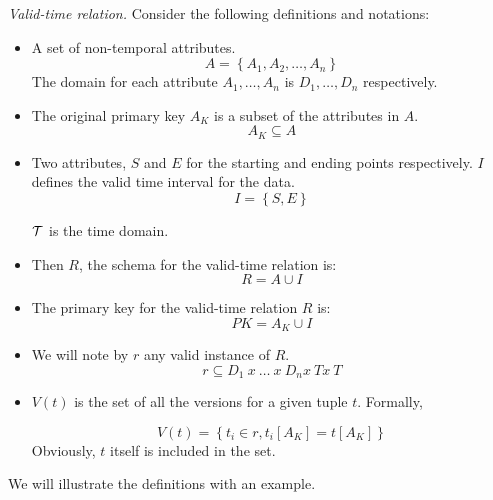 \begin{definition}
\label{def:valid-time-relation}
\emph{Valid-time relation.}
Consider the following definitions and notations:

\begin{itemize}
 \item A set of non-temporal attributes.
	\begin{equation}
	\label{eq:attribute-set}
	A = \left \lbrace A_1, A_2, \ldots, A_n \right \rbrace
	\end{equation}
      The domain for each attribute $A_1, \ldots, A_n$ is $D_1, \ldots, D_n$ respectively. 
\item The original primary key $A_K$ is a subset of the attributes in $A$.
      \begin{equation}
       \label{eq:primary-key-a}
      A_K \subseteq A
      \end{equation}
\item Two attributes, $S$  and $E$ for the starting and ending points respectively. $I$ defines the valid time interval for the data. 
\begin{equation}
 \label{eq:attribute-time-interval}
I = \left \lbrace S, E \right \rbrace
\end{equation}

$\mathcal{T}$ is the time domain.

\item Then $R$, the schema for the valid-time relation is:
\begin{equation}
 \label{eq:valid-time-relation}
R = A \cup  I
\end{equation}
\item The primary key for the valid-time relation $R$ is:
\begin{equation}
 \label{eq:valid-time-temporal-pk}
PK = A_K \cup I
\end{equation}


\item We will note by $r$ any valid instance of $R$. 
      \begin{equation}
       \label{eq:valid-time-instance}
      r \subseteq D_1\ x\ \ldots\ x\ D_n x\ T x\ T
      \end{equation}


\item $V(t)$ is the set of all the versions for a given tuple $t$. Formally,

\begin{equation}
 \label{eq:all-the-versions}
V(t) =\left \lbrace t_i \in r, t_i\left[A_K\right] = t\left[A_K\right] \right \rbrace
\end{equation}
Obviously, $t$ itself is included in the set.
\end{itemize}
\end{definition}
We will illustrate the definitions with an example.

